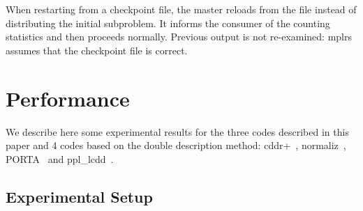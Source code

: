 \documentclass[a4paper,11pt]{article}   \usepackage{authblk} \usepackage[top=1.9cm,bottom=1.9cm,left=1.9cm,right=1.9cm]{geometry}
\newcommand{\progname}{\textsf}
\newcommand{\mplrs}{\progname{mplrs}\xspace}
\newcommand{\norm}{\progname{normaliz}\xspace}
\newcommand{\cdd}{\progname{cddr+}\xspace}
\newcommand{\porta}{\progname{PORTA}\xspace}
\newcommand{\ppl}{\progname{ppl\_lcdd}\xspace}
\begin{document}
When restarting from a checkpoint file, the master reloads  from the
file instead of
distributing the initial subproblem.  It informs the consumer of the counting
statistics and then proceeds normally.  Previous output is not re-examined: 
\mplrs assumes that the checkpoint file is correct.

\section{Performance}
\label{sec:experiments}

We describe here some experimental results for the
three codes described in this paper and 4 codes based on the double description method:
\cdd~\cite{cdd}, \norm~\cite{norm}, \porta~\cite{porta} and \ppl~\cite{ppl}.

\subsection{Experimental Setup}
\label{subsec:expsetup}
\end{document}
